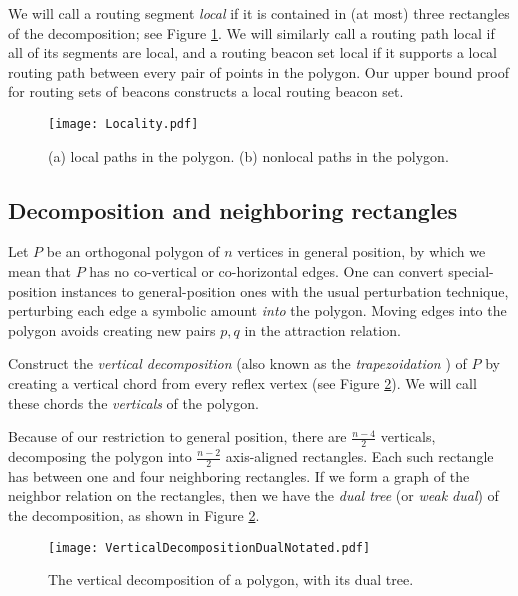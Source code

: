 \documentclass{article}
\begin{document}
		We will call a routing segment \emph{local} if it is contained in (at most) 
		three rectangles of the decomposition; see Figure \ref{fig:local}. We will
		similarly call a routing path local if all of its segments are local,
		and a routing beacon set local if it supports a local
		routing path between every pair of points in the polygon.
		Our upper bound proof for routing sets of beacons constructs a local routing
		beacon set.		
		
		\begin{figure}[htbp] 
			\begin{center}
			    \texttt{[image: Locality.pdf]} 
			\end{center}
			\caption{
				(a) local paths in the polygon.
				(b) nonlocal paths in the polygon.
			}
			\label{fig:local}
		\end{figure}
	
	\subsection{Decomposition and neighboring rectangles}
		Let $P$ be an orthogonal polygon of $n$ vertices in general position,
		by which we mean that $P$ has no co-vertical or co-horizontal edges.
		One can convert special-position instances to general-position ones
		with the usual perturbation technique, perturbing each edge a symbolic amount
		\emph{into} the polygon.  Moving edges into the polygon avoids creating
		new pairs $p, q$ in the attraction relation.
		
		Construct the \emph{vertical decomposition}
		(also known as the \emph{trapezoidation} \cite{fournier1984triangulating}) of
		$P$ by creating a vertical chord from every reflex vertex (see Figure
		\ref{fig:dualTree}).  We will call these chords the \emph{verticals} of the
		polygon.
		
			Because of our restriction to general position, there are $\frac{n-4}{2}$
		verticals, decomposing the polygon into $\frac{n-2}{2}$ axis-aligned rectangles.
		Each such rectangle has between one and four neighboring rectangles.
		If we form a graph of the neighbor relation on the rectangles, then we have
		the \emph{dual tree} (or \emph{weak dual}) of the decomposition, as shown in
		Figure \ref{fig:dualTree}.
		
		\begin{figure}[htbp] 
			\begin{center}
			    \texttt{[image: VerticalDecompositionDualNotated.pdf]} 
			\end{center}
			\caption{The vertical decomposition of a polygon, with its dual tree.}
			\label{fig:dualTree}
		\end{figure} 
		
\end{document}
